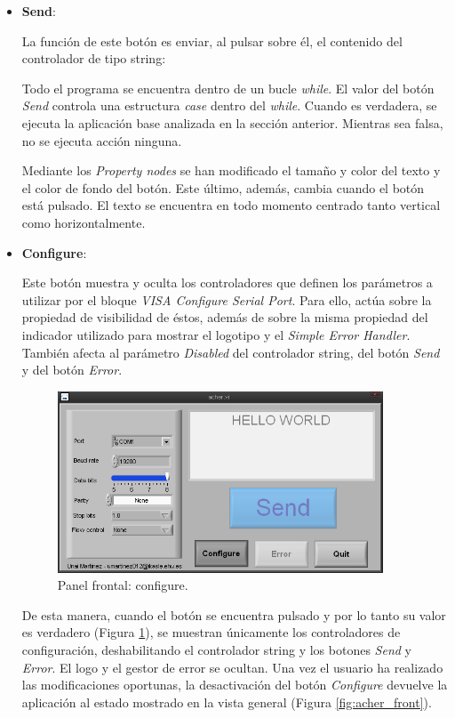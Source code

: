 \begin{itemize}

\item{\textbf{Send}:

La función de este botón es enviar, al pulsar sobre él, el contenido del controlador de tipo string:

Todo el programa se encuentra dentro de un bucle \textit{while}. El valor del botón \textit{Send} controla una estructura \textit{case} dentro del \textit{while}. Cuando es verdadera, se ejecuta la aplicación base analizada en la sección anterior. Mientras sea falsa, no se ejecuta acción ninguna.

Mediante los \textit{Property nodes} se han modificado el tamaño y color del texto y el color de fondo del botón. Este último, además, cambia cuando el botón está pulsado. El texto se encuentra en todo momento centrado tanto vertical como horizontalmente.
}

\item{\textbf{Configure}:

Este botón muestra y oculta los controladores que definen los parámetros a utilizar por el bloque \textit{VISA Configure Serial Port}. Para ello, actúa sobre la propiedad de visibilidad de éstos, además de sobre la misma propiedad del indicador utilizado para mostrar el logotipo y el \textit{Simple Error Handler}. También afecta al parámetro \textit{Disabled} del controlador string, del botón \textit{Send} y del botón \textit{Error}.

\begin{figure}[!htp]
\centering
\includegraphics[width=275pt]{./images/acher_config.png}
\caption{Panel frontal: configure.}
\label{fig:acher_config}
\end{figure}

De esta manera, cuando el botón se encuentra pulsado y por lo tanto su valor es verdadero (Figura \ref{fig:acher_config}), se muestran únicamente los controladores de configuración, deshabilitando el controlador string y los botones \textit{Send} y \textit{Error}. El logo y el gestor de error se ocultan. Una vez el usuario ha realizado las modificaciones oportunas, la desactivación del botón \textit{Configure} devuelve la aplicación al estado mostrado en la vista general (Figura \ref{fig:acher_front}).

}
\end{itemize}
